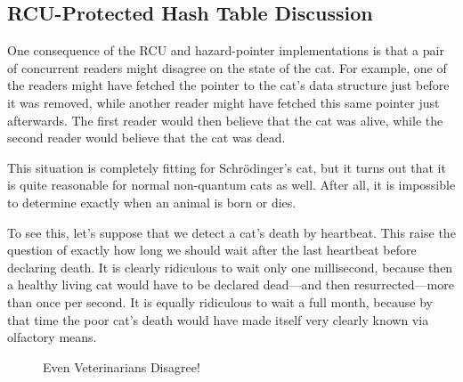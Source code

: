 \QuickQuizEnd

\subsection{RCU-Protected Hash Table Discussion}
\label{sec:datastruct:RCU-Protected Hash Table Discussion}

One consequence of the RCU and hazard-pointer implementations is
that a pair of concurrent readers might disagree on the state of
the cat.
For example, one of the readers might have fetched the pointer to
the cat's data structure just before it was removed, while another
reader might have fetched this same pointer just afterwards.
The first reader would then believe that the cat was alive, while
the second reader would believe that the cat was dead.

This situation is completely fitting for Schr\"odinger's
cat, but it turns out that it is quite reasonable for normal
non-quantum cats as well.
After all, it is impossible to determine exactly when an animal is born
or dies.

To see this, let's suppose that we detect a cat's death by heartbeat.
This raise the question of exactly how long we should wait after the
last heartbeat before declaring death.
It is clearly ridiculous to wait only one millisecond, because then
a healthy living cat would have to be declared dead---and then
resurrected---more than once per second.
It is equally ridiculous to wait a full month, because by that time
the poor cat's death would have made itself very clearly known
via olfactory means.

\begin{figure}
\centering
{}
\caption{Even Veterinarians Disagree!}
\end{figure}

